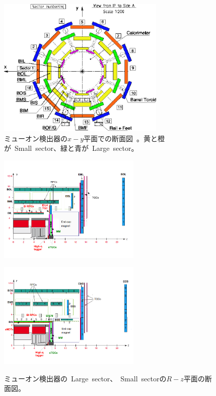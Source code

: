 \begin{figure}[h]
  \centering
  \includegraphics[clip, width=8cm]{fig/2/muon_detector_xy.pdf}
  \caption{ミューオン検出器の$x-y$平面での断面図~\cite{Aad:1129811}。黄と橙が~Small~sector、緑と青が~Large~sector。}
  \label{fig:2-14}
\end{figure}


\begin{figure}[h]
  \begin{minipage}[b]{0.48\linewidth}
      \centering
      \includegraphics[clip, width=6.8cm]{fig/2/muon_Rz_Large.pdf}
      \label{fig:2-15-1}
  \end{minipage}
    \begin{minipage}[b]{0.48\linewidth}
      \centering
      \includegraphics[clip, width=6.8cm]{fig/2/muon_Rz_small.pdf}
      \label{fig:2-15-2}
  \end{minipage}
  \caption{ミューオン検出器の~Large~sector、~Small~sectorの$R-z$平面の断面図\cite{article:phase2}。}
\end{figure}

